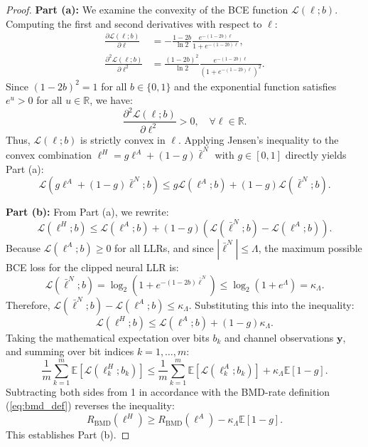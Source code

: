 \documentclass[journal,onecolumn]{IEEEtran}
\begin{document}
\begin{proof}
\textbf{Part (a):} We examine the convexity of the BCE function $\mathcal{L}(\ell; b)$. Computing the first and second derivatives with respect to $\ell$:
\begin{align}
\frac{\partial \mathcal{L}(\ell; b)}{\partial \ell} &= -\frac{1 - 2b}{\ln 2} \frac{e^{-(1 - 2b)\ell}}{1 + e^{-(1 - 2b)\ell}}, \\
\frac{\partial^2 \mathcal{L}(\ell; b)}{\partial \ell^2} &= \frac{(1 - 2b)^2}{\ln 2} \frac{e^{-(1 - 2b)\ell}}{\left(1 + e^{-(1 - 2b)\ell}\right)^2}.
\end{align}
Since $(1 - 2b)^2 = 1$ for all $b \in \{0, 1\}$ and the exponential function satisfies $e^u > 0$ for all $u \in \mathbb{R}$, we have:
\begin{equation}
\frac{\partial^2 \mathcal{L}(\ell; b)}{\partial \ell^2} > 0, \quad \forall \ell \in \mathbb{R}.
\end{equation}
Thus, $\mathcal{L}(\ell; b)$ is strictly convex in $\ell$. Applying Jensen's inequality to the convex combination $\ell^H = g \ell^A + (1 - g) \bar{\ell}^N$ with $g \in [0, 1]$ directly yields Part (a):
\begin{equation}
\mathcal{L}(g \ell^A + (1 - g) \bar{\ell}^N; b) \le g \mathcal{L}(\ell^A; b) + (1 - g) \mathcal{L}(\bar{\ell}^N; b).
\end{equation}

\textbf{Part (b):} From Part (a), we rewrite:
\begin{equation}
\mathcal{L}(\ell^H; b) \le \mathcal{L}(\ell^A; b) + (1 - g) \left( \mathcal{L}(\bar{\ell}^N; b) - \mathcal{L}(\ell^A; b) \right).
\end{equation}
Because $\mathcal{L}(\ell^A; b) \ge 0$ for all LLRs, and since $|\bar{\ell}^N| \le \Lambda$, the maximum possible BCE loss for the clipped neural LLR is:
\begin{equation}
\mathcal{L}(\bar{\ell}^N; b) = \log_2\left(1 + e^{-(1-2b)\bar{\ell}^N}\right) \le \log_2\left(1 + e^{\Lambda}\right) = \kappa_\Lambda.
\end{equation}
Therefore, $\mathcal{L}(\bar{\ell}^N; b) - \mathcal{L}(\ell^A; b) \le \kappa_\Lambda$. Substituting this into the inequality:
\begin{equation}
\mathcal{L}(\ell^H; b) \le \mathcal{L}(\ell^A; b) + (1 - g) \kappa_\Lambda.
\end{equation}
Taking the mathematical expectation over bits $b_k$ and channel observations $\bm{y}$, and summing over bit indices $k=1, \dots, m$:
\begin{equation}
\frac{1}{m} \sum_{k=1}^m \mathbb{E} \left[ \mathcal{L}(\ell^H_k; b_k) \right] \le \frac{1}{m} \sum_{k=1}^m \mathbb{E} \left[ \mathcal{L}(\ell^A_k; b_k) \right] + \kappa_\Lambda \mathbb{E}[1 - g].
\end{equation}
Subtracting both sides from 1 in accordance with the BMD-rate definition (\ref{eq:bmd_def}) reverses the inequality:
\begin{equation}
R_{\text{BMD}}(\bm{\ell}^H) \ge R_{\text{BMD}}(\bm{\ell}^A) - \kappa_\Lambda \mathbb{E}[1 - g].
\end{equation}
This establishes Part (b).


\end{proof}
\end{document}

